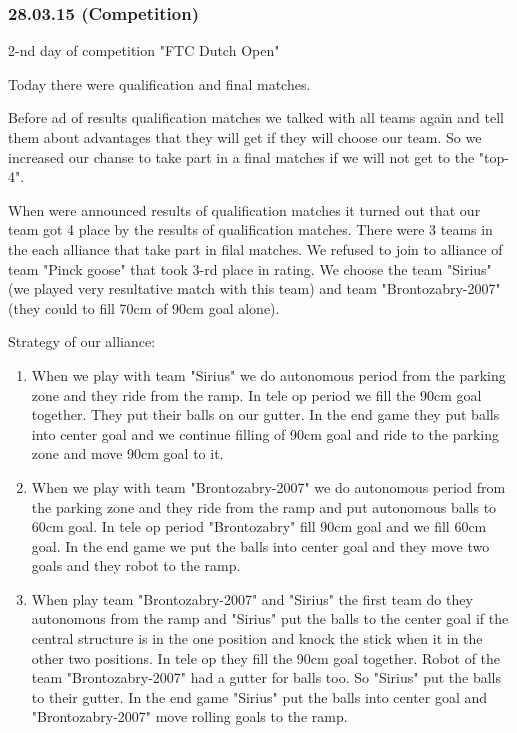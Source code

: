 \subsubsection{28.03.15 (Competition)}
\begin{center}
	2-nd day of competition "FTC Dutch Open"
\end{center}
Today there were qualification and final matches.\newline

Before ad of results qualification matches we talked with all teams again and tell them about advantages that they will get if they will choose our team. So we increased our chanse to take part in a final matches if we will not get to the "top-4".\newline

When were announced results of qualification matches it turned out that our team got 4 place by the results of qualification matches. There were 3 teams in the each alliance that take part in filal matches. We refused to join to alliance of team "Pinck goose" that took 3-rd place in rating. We choose the team "Sirius"(we played very resultative match with this team) and team "Brontozabry-2007" (they could to fill 70cm of 90cm goal alone).\newline

Strategy of our alliance:
\begin{enumerate}
	\item When we play with team "Sirius" we do autonomous period from the parking zone and they ride from the ramp. In tele op period we fill the 90cm goal together. They put their balls on our gutter. In the end game they put balls into center goal and we continue filling of 90cm goal and ride to the parking zone and move 90cm goal to it.
	
	\item When we play with team "Brontozabry-2007" we do autonomous period from the parking zone and they ride from the ramp and put autonomous balls to 60cm goal. In tele op period "Brontozabry" fill 90cm goal and we fill 60cm goal. In the end game we put the balls into center goal and they move two goals and they robot to the ramp.
	
	\item When play team "Brontozabry-2007" and "Sirius" the first team do they autonomous from the ramp and "Sirius" put the balls to the center goal if the central structure is in the one position and knock the stick when it in the other two positions. In tele op they fill the 90cm goal together. Robot of the team "Brontozabry-2007" had a gutter for balls too. So "Sirius" put the balls to their gutter. In the end game "Sirius" put the balls into center goal and "Brontozabry-2007" move rolling goals to the ramp. 
\end{enumerate}



